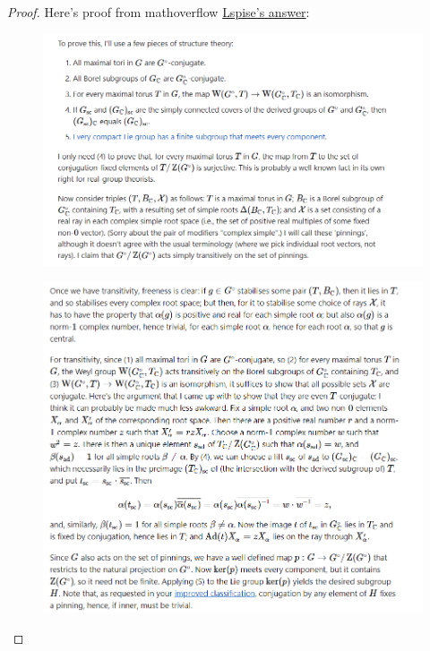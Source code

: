 \documentclass[12pt]{amsart}
\numberwithin{equation}{section}
\begin{document}
\begin{proof}
  Here's proof from mathoverflow \href{https://mathoverflow.net/questions/377981/classification-of-not-necessarily-connected-compact-lie-groups/378141#378141}{Lspise's answer}:
  \begin{figure}[H]
    \centering
    \includegraphics[width=1.0\linewidth]{1.png}
  \end{figure}

  \begin{figure}[H]
    \centering
    \includegraphics[width=1.0\linewidth]{2.png}
  \end{figure}
\end{proof}

\newpage
\end{document}
